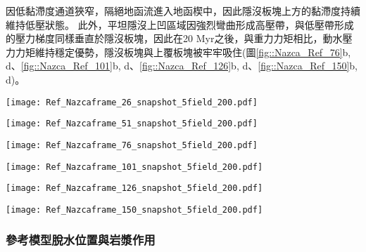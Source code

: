 因低黏滯度通道狹窄，隔絕地函流進入地函楔中，因此隱沒板塊上方的黏滯度持續維持低壓狀態。
此外，平坦隱沒上凹區域因強烈彎曲形成高壓帶，與低壓帶形成的壓力梯度同樣垂直於隱沒板塊，因此在20 Myr之後，與重力力矩相比，動水壓力力矩維持穩定優勢，隱沒板塊與上覆板塊被牢牢吸住(圖\ref{fig::Nazca_Ref_76}b, d、\ref{fig::Nazca_Ref_101}b, d、\ref{fig::Nazca_Ref_126}b, d、\ref{fig::Nazca_Ref_150}b, d)。


\begin{figure*}[htp]
    \centering
    \texttt{[image: Ref\_Nazcaframe\_26\_snapshot\_5field\_200.pdf]}
    \caption[納茲卡參考模型於5 Myr時之結果。]{納茲卡參考模型於5 Myr時之結果。}
    \label{fig::Nazca_Ref_26}
\end{figure*}

\begin{figure*}[htp]
    \centering
    \texttt{[image: Ref\_Nazcaframe\_51\_snapshot\_5field\_200.pdf]}
    \caption[納茲卡參考模型於10 Myr時之結果。]{納茲卡參考模型於10 Myr時之結果。}
    \label{fig::Nazca_Ref_51}
\end{figure*}

\begin{figure*}[htp]
    \centering
    \texttt{[image: Ref\_Nazcaframe\_76\_snapshot\_5field\_200.pdf]}
    \caption[納茲卡參考模型於15 Myr時之結果。]{納茲卡參考模型於15 Myr時之結果。}
    \label{fig::Nazca_Ref_76}
\end{figure*}

\begin{figure*}[htp]
    \centering
    \texttt{[image: Ref\_Nazcaframe\_101\_snapshot\_5field\_200.pdf]}
    \caption[納茲卡參考模型於20 Myr時之結果。]{納茲卡參考模型於20 Myr時之結果。}
    \label{fig::Nazca_Ref_101}
\end{figure*}

\begin{figure*}[htp]
    \centering
    \texttt{[image: Ref\_Nazcaframe\_126\_snapshot\_5field\_200.pdf]}
    \caption[納茲卡參考模型於25 Myr時之結果。]{納茲卡參考模型於25 Myr時之結果。}
    \label{fig::Nazca_Ref_126}
\end{figure*}


\begin{figure*}[htp]
    \centering
    \texttt{[image: Ref\_Nazcaframe\_150\_snapshot\_5field\_200.pdf]}
    \caption[納茲卡參考模型於30 Myr時之結果。]{納茲卡參考模型於30 Myr時之結果。}
    \label{fig::Nazca_Ref_150}
\end{figure*}

\subsubsection{參考模型脫水位置與岩漿作用}

